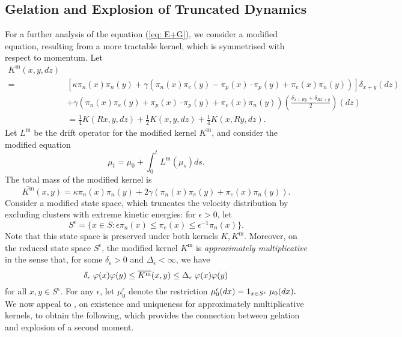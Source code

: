 \documentclass[11pt, notitlepage]{article}
\begin{document}
\subsection{\textbf{Gelation and Explosion of Truncated Dynamics}}
 For a further analysis of the equation (\ref{eq: E+G}), we consider a modified equation, resulting from a more tractable kernel, which is symmetrised with respect to momentum. Let
 \begin{equation}\label{eq: modified K} 
 \begin{split}
 K^\mathrm{m}(x,y,dz)& \\  = & \left[\kappa \pi_n(x) \pi_n(y) +\gamma\left(\pi_n(x)\pi_e(y)-\pi_p(x)\cdot \pi_p(y)+ \pi_e(x)\pi_n(y)\right)\right]\delta_{x+y}(dz) \\ & + \gamma(\pi_n(x)\pi_e(y)+\pi_p(x)\cdot \pi_p(y)+ \pi_e(x)\pi_n(y))\left(\frac{\delta_{x+Ry}+\delta_{Rx+y}}{2}\right)(dz) \\ & 
 =\frac{1}{4}K(Rx, y, dz)+\frac{1}{2}K(x,y,dz)+\frac{1}{4}K(x,Ry, dz). \end{split} 
\end{equation}
Let $L^\mathrm{m}$ be the drift operator for the modified kernel $K^\mathrm{m}$, and consider the modified equation \begin{equation} \tag{mE-G}\label{eq: mE}
    \mu_t=\mu_0+\int_0^t L^\mathrm{m}(\mu_s)ds.
\end{equation}The total mass of the modified kernel is \begin{equation}
    \label{eq: modified Kbar} 
    \overline{K^\mathrm{m}}(x,y)=\kappa \pi_n(x) \pi_n(y) + 2\gamma(\pi_n(x)\pi_e(y)+\pi_e(x)\pi_n(y)).
\end{equation}
Consider a modified state space, which truncates the velocity distribution by excluding clusters with extreme kinetic energies: for $\epsilon>0$, let \begin{equation}
    S^\epsilon= \{x\in S: \epsilon \pi_n(x) \leq \pi_e(x) \leq \epsilon^{-1} \pi_n(x)\}.
\end{equation} Note that this state space is preserved under both kernels $K, K^\mathrm{m}$. Moreover, on the reduced state space $S^\epsilon$, the modified kernel $K^\mathrm{m}$ is \emph{approximately multiplicative} \cite{N00} in the sense that, for some $\delta_\epsilon>0$ and $\Delta_\epsilon<\infty$, we have \begin{equation}
    \delta_\epsilon\hspace{0.1cm}\varphi(x)\varphi(y) \leq \overline{K^\mathrm{m}}(x,y) \leq  \Delta_\epsilon\hspace{0.1cm}\varphi(x)\varphi(y)
\end{equation}for all $x,y \in S^\epsilon$. For any $\epsilon$, let $\mu_0^\epsilon$ denote the restriction $\mu_0^\epsilon(dx)=1_{x\in S^\epsilon}\hspace{0.1cm}\mu_0(dx).$ We now appeal to \cite[Theorem 2.2]{N00}, on existence and uniqueness for approximately multiplicative kernels, to obtain the following, which provides the connection between gelation and explosion of a second moment.
\end{document}
